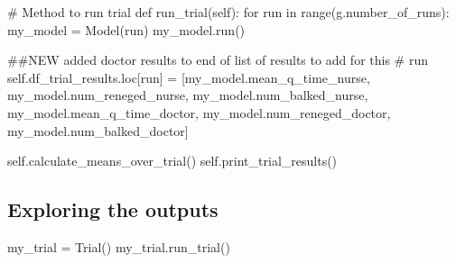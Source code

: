 \documentclass[
  letterpaper,
  DIV=11,
  numbers=noendperiod]{scrreprt}
\newenvironment{Shaded}{\begin{snugshade}}{\end{snugshade}}
\newcommand{\BuiltInTok}[1]{\textcolor[rgb]{0.00,0.23,0.31}{#1}}
\newcommand{\CommentTok}[1]{\textcolor[rgb]{0.37,0.37,0.37}{#1}}
\newcommand{\ControlFlowTok}[1]{\textcolor[rgb]{0.00,0.23,0.31}{#1}}
\newcommand{\KeywordTok}[1]{\textcolor[rgb]{0.00,0.23,0.31}{#1}}
\newcommand{\NormalTok}[1]{\textcolor[rgb]{0.00,0.23,0.31}{#1}}
\newcommand{\OperatorTok}[1]{\textcolor[rgb]{0.37,0.37,0.37}{#1}}
\newcommand{\VariableTok}[1]{\textcolor[rgb]{0.07,0.07,0.07}{#1}}
\begin{document}
\begin{tcolorbox}
\begin{Shaded}
\begin{Highlighting}[]
    \CommentTok{\# Method to run trial}
    \KeywordTok{def}\NormalTok{ run\_trial(}\VariableTok{self}\NormalTok{):}
        \ControlFlowTok{for}\NormalTok{ run }\KeywordTok{in} \BuiltInTok{range}\NormalTok{(g.number\_of\_runs):}
\NormalTok{            my\_model }\OperatorTok{=}\NormalTok{ Model(run)}
\NormalTok{            my\_model.run()}

            \CommentTok{\#\#NEW added doctor results to end of list of results to add for this}
            \CommentTok{\# run}
            \VariableTok{self}\NormalTok{.df\_trial\_results.loc[run] }\OperatorTok{=}\NormalTok{ [my\_model.mean\_q\_time\_nurse,}
\NormalTok{                                              my\_model.num\_reneged\_nurse,}
\NormalTok{                                              my\_model.num\_balked\_nurse,}
\NormalTok{                                              my\_model.mean\_q\_time\_doctor,}
\NormalTok{                                              my\_model.num\_reneged\_doctor,}
\NormalTok{                                              my\_model.num\_balked\_doctor]}

        \VariableTok{self}\NormalTok{.calculate\_means\_over\_trial()}
        \VariableTok{self}\NormalTok{.print\_trial\_results()}
\end{Highlighting}
\end{Shaded}

\end{tcolorbox}

\subsection{Exploring the outputs}\label{exploring-the-outputs-2}

\begin{Shaded}
\begin{Highlighting}[]
\NormalTok{my\_trial }\OperatorTok{=}\NormalTok{ Trial()}
\NormalTok{my\_trial.run\_trial()}
\end{Highlighting}
\end{Shaded}
\end{document}
